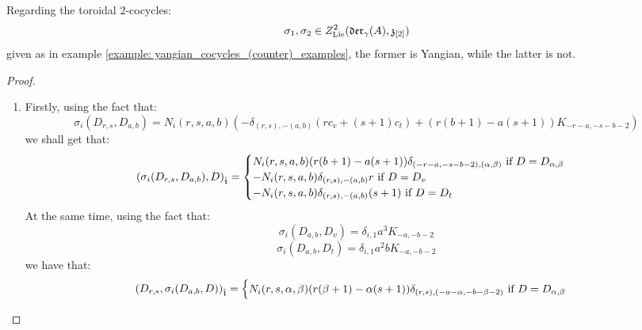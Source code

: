         \begin{proposition} \label{prop: yangianness_of_billig_toroidal_cocycles}
            Regarding the toroidal $2$-cocycles:
                $$\sigma_1, \sigma_2 \in Z^2_{\Lie}(\divzero, \z_{[2]})$$
            given as in example \ref{example: yangian_cocycles_(counter)_examples}, the former is Yangian, while the latter is not.
        \end{proposition}
            \begin{proof}
                \begin{enumerate}
                    \item Firstly, using the fact that:
                        $$\sigma_i(D_{r, s}, D_{a, b}) = N_i(r, s, a, b) \left( -\delta_{(r, s), -(a, b)} (r c_v + (s + 1) c_t) + ( r(b + 1) - a(s + 1) )K_{-r - a, -s - b - 2} \right)$$
                    we shall get that:
                        $$
                            \left( \sigma_i(D_{r, s}, D_{a, b}), D \right)_{\extendedtoroidal} =
                            \begin{cases}
                                \text{$N_i(r, s, a, b) ( r(b + 1) - a(s + 1) ) \delta_{(-r - a, -s - b - 2), (\alpha, \beta)}$ if $D = D_{\alpha, \beta}$}
                                \\
                                \text{$-N_i(r, s, a, b) \delta_{(r, s), -(a, b)} r$ if $D = D_v$}
                                \\
                                \text{$-N_i(r, s, a, b) \delta_{(r, s), -(a, b)} (s + 1)$ if $D = D_t$}
                            \end{cases}
                        $$
                    At the same time, using the fact that:
                        $$\sigma_i(D_{a, b}, D_v) = \delta_{i, 1} a^3 K_{-a, -b - 2}$$
                        $$\sigma_i(D_{a, b}, D_t) = \delta_{i, 1} a^2b K_{-a, -b - 2}$$
                    we have that:
                        $$
                            \begin{aligned}
                                \left( D_{r, s}, \sigma_i(D_{a, b}, D) \right)_{\extendedtoroidal} =
                                \begin{cases}
                                    \text{$N_i(r, s, \alpha, \beta) ( r(\beta + 1) - \alpha(s + 1) ) \delta_{(r, s), (-a - \alpha, -b - \beta - 2)}$ if $D = D_{\alpha, \beta}$}
                                    \\

\end{cases}
\end{aligned}$$
\end{enumerate}
\end{proof}
